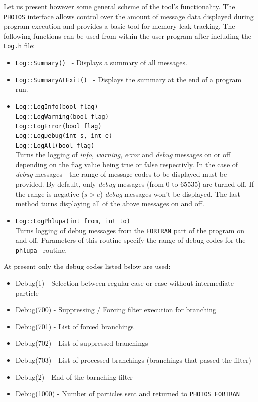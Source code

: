\documentclass[]{Photos_interface_design}
\begin{document}
Let us present however some general scheme of the tool's
functionality.  The {\tt PHOTOS} interface allows control over the
amount of message data displayed during program execution and
provides a basic tool for memory leak tracking. The following
functions can be used from within the user program after including the
{\tt Log.h} file:
\begin{itemize}
  \item {\tt Log::Summary() } - Displays a summary of all messages.
  \item {\tt Log::SummaryAtExit() } - Displays the summary at the end of a program run.
  \item {\tt Log::LogInfo(bool flag) } \\
        {\tt Log::LogWarning(bool flag) } \\
        {\tt Log::LogError(bool flag) } \\
        {\tt Log::LogDebug(int s, int e) } \\
        {\tt Log::LogAll(bool flag)} \\
        Turns the logging of \textit{info}, \textit{warning}, \textit{error} and \textit{debug} messages on or off depending
        on the flag value being true or false respectivly. In the case of \textit{debug} messages - the range of message codes
        to be displayed must be provided. By default, only \textit{debug} messages
        (from 0 to 65535) are turned off. If the range is negative ($s>e$) \textit{debug} messages
        won't be displayed. The last method turns displaying all of the above messages on and off.
  \item {\tt Log::LogPhlupa(int from, int to) } \\
        Turns logging of debug messages from the {\tt FORTRAN} part of the program on and off.
        Parameters of this routine specify the range of debug codes for the {\tt phlupa\_} routine.
\end{itemize}

At present only the debug codes listed below are used:
\begin{itemize}
  \item Debug(1) - Selection between regular case or case without intermediate particle
  \item Debug(700) - Suppressing / Forcing filter execution for branching
  \item Debug(701) - List of forced branchings
  \item Debug(702) - List of suppressed branchings
  \item Debug(703) - List of processed branchings (branchings that passed the filter)
  \item Debug(2) - End of the barnching filter
  \item Debug(1000) - Number of particles sent and returned to {\tt PHOTOS FORTRAN}
\end{itemize}
 
\end{document}
